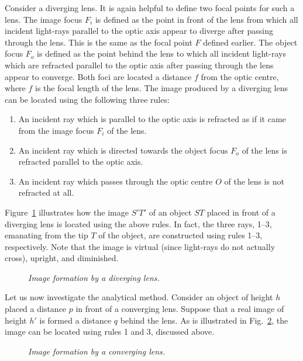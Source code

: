 Consider a diverging lens. It is again helpful to
define two focal points for such a lens. The image focus $F_i$ is
defined as the point in front of the lens from which all
incident light-rays parallel to the optic axis appear to diverge after 
passing through the lens. This is the same as the focal point $F$
defined earlier. 
The object focus $F_o$ is
defined as the point behind the lens to which all
incident light-rays which are refracted parallel to the optic
axis after passing through the lens appear to converge. Both foci
are located a distance $f$ from the optic centre, where $f$ is the
focal length of the lens. The image produced by a diverging lens
can be located using the following three rules:
\begin{enumerate}
\item An incident ray which is parallel to the optic
axis is refracted as if it came from the image focus $F_i$ of the lens.
\item An incident ray which is directed towards the object focus 
$F_o$ of the lens is refracted parallel to the optic axis.
\item An incident ray which passes through the optic centre $O$ of
the lens is not refracted at all. 
\end{enumerate}

Figure~\ref{f13.14} illustrates how the image  $S'T'$ of an object $ST$
placed in front of a diverging  lens
is located using the above rules. 
In fact, the three rays, 1--3, emanating from
the tip $T$ of the object, are constructed using rules 1--3, respectively. 
Note that the image is virtual (since light-rays do not
actually cross), upright, and
diminished. 

\begin{figure}
\epsfysize=3in
\centerline{}
\caption{\em Image formation by a diverging lens.}\label{f13.14}
\end{figure}

Let us now investigate the analytical method.
Consider an object of height $h$ placed a distance $p$ in
front of a converging lens.
Suppose that  a real image of height $h'$ is formed a distance
$q$ behind the lens. As is illustrated in Fig.~\ref{f13.15},
the image can be located using rules 1 and 3,
 discussed
above. 

\begin{figure}
\epsfysize=3in
\centerline{}
\caption{\em Image formation by a converging lens.}\label{f13.15}
\end{figure}

